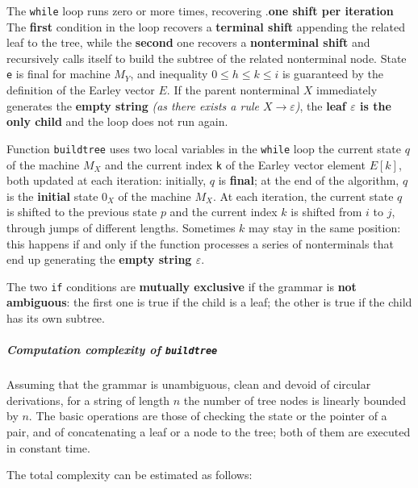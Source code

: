 \documentclass[english]{article}
\begin{document}
The \texttt{while} loop runs zero or more times, recovering .\textbf{one shift per iteration}
The \textbf{first} condition in the loop recovers a \textbf{terminal shift} appending the related leaf to the tree, while the \textbf{second} one recovers a \textbf{nonterminal shift} and recursively calls itself to build the subtree of the related nonterminal node.
State \texttt{e} is final for machine \(M_Y\), and inequality \(0 \leq h \leq k \leq i\) is guaranteed by the definition of the Earley vector \(E\).
If the parent nonterminal \(X\) immediately generates the \textbf{empty string} \textit{(as there exists a rule \(X \rightarrow \varepsilon\))}, the \textbf{leaf \(\varepsilon\) is the only child} and the loop does not run again.

Function \texttt{buildtree} uses two local variables in the \texttt{while} loop the current state \(q\) of the machine \(M_X\) and the current index \texttt{k} of the Earley vector element \(E[k]\), both updated at each iteration:
initially, \(q\) is \textbf{final}; at the end of the algorithm, \(q\) is the \textbf{initial} state \(0_X\) of the machine \(M_X\).
At each iteration, the current state \(q\) is shifted to the previous state \(p\) and the current index \(k\) is shifted from \(i\) to \(j\), through jumps of different lengths.
Sometimes \(k\) may stay in the same position: this happens if and only if the function processes a series of nonterminals that end up generating the \textbf{empty string \(\varepsilon\)}.

The two \texttt{if} conditions are \textbf{mutually exclusive} if the grammar is \textbf{not ambiguous}:
the first one is true if the child is a leaf; the other is true if the child has its own subtree.

\subparagraph*{Computation complexity of \texttt{buildtree}}

Assuming that the grammar is unambiguous, clean and devoid of circular derivations, for a string of length \(n\) the number of tree nodes is linearly bounded by \(n\).
The basic operations are those of checking the state or the pointer of a pair, and of concatenating a leaf or a node to the tree; both of them are executed in constant time.

The total complexity can be estimated as follows:
\end{document}
